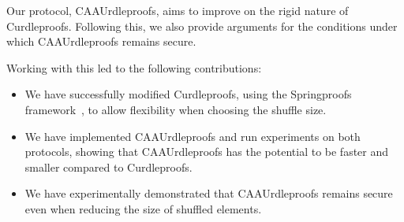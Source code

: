 Our protocol, CAAUrdleproofs, aims to improve on the rigid nature of Curdleproofs.
Following this, we also provide arguments for the conditions under which CAAUrdleproofs remains secure.

Working with this led to the following contributions:
\begin{itemize}
    \item We have successfully modified Curdleproofs, using the Springproofs framework~\cite{zhang2024springproofs}, to allow flexibility when choosing the shuffle size.
    \item We have implemented CAAUrdleproofs and run experiments on both protocols, showing that CAAUrdleproofs has the potential to be faster and smaller compared to Curdleproofs.
    \item We have experimentally demonstrated that CAAUrdleproofs remains secure even when reducing the size of shuffled elements.
\end{itemize}


